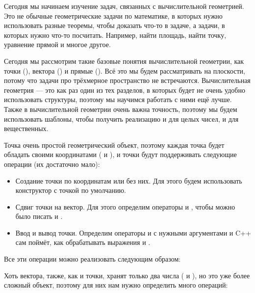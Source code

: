 Сегодня мы начинаем изучение задач, связанных с вычислительной геометрией. Это не обычные геометрические задачи по математике, в которых нужно использовать разные теоремы, чтобы доказать что-то в задаче, а задачи, в которых нужно что-то посчитать. Например, найти площадь, найти точку, уравнение прямой и многое другое.

Сегодня мы рассмотрим такие базовые понятия вычислительной геометрии, как точки (), вектора () и прямые (). Всё это мы будем рассматривать на плоскости, потому что задачи про трёхмерное пространство не встречаются. Вычислительная геометрия — это как раз один из тех разделов, в которых будет не очень удобно использовать структуры, поэтому мы научимся работать с ними ещё лучше. Также в вычислительной геометрии очень важна точность, поэтому мы будем использовать шаблоны, чтобы получить реализацию и для целых чисел, и для вещественных.


Точка очень простой геометрический объект, поэтому каждая точка будет обладать своими координатами ( и ), и точки будут поддерживать следующие операции (их достаточно мало):

\begin{itemize}
    \item Создание точки по координатам или без них. Для этого будем использовать конструктор с точкой  по умолчанию.
    \item Сдвиг точки на вектор. Для этого определим операторы \lcpp{+} и \lcpp{-}, чтобы можно было писать  и .
    \item Ввод и вывод точки. Определим операторы \lcpp{>>} и \lcpp{<<} с нужными аргументами и C++ сам поймёт, как обрабатывать выражения  и .
\end{itemize}

Все эти операции можно реализовать следующим образом:



Хоть вектора, также, как и точки, хранят только два числа ( и ), но это уже более сложный объект, поэтому для них нам нужно определить много операций:

